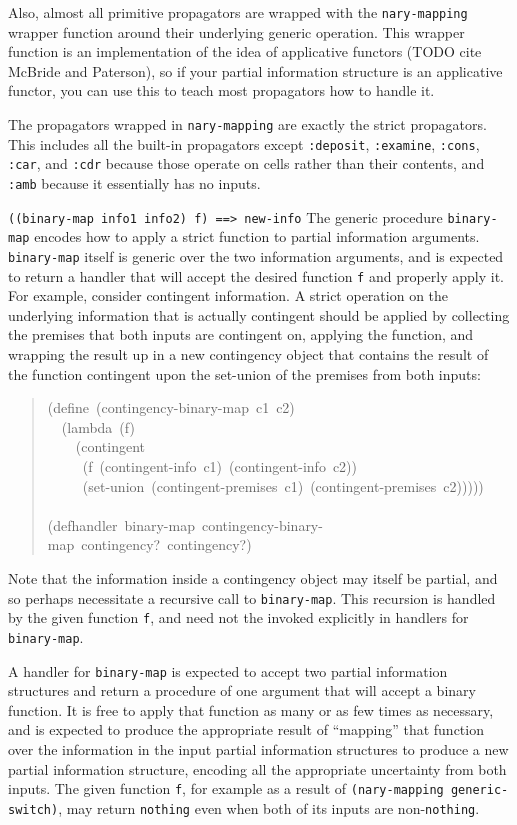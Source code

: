 \documentclass[12pt,letterpaper,english]{article}
\begin{document}
Also, almost all primitive propagators are wrapped
with the \texttt{nary-mapping} wrapper function around their underlying
generic operation.  This wrapper function is an implementation of the
idea of applicative functors (TODO cite McBride and Paterson), so if
your partial information structure is an applicative functor, you can
use this to teach most propagators how to handle it.

The propagators wrapped in \texttt{nary-mapping} are exactly the strict
propagators.  This includes all the built-in propagators except
\texttt{:deposit}, \texttt{:examine}, \texttt{:cons}, \texttt{:car}, and \texttt{:cdr} because
those operate on cells rather than their contents, and \texttt{:amb}
because it essentially has no inputs.

\texttt{((binary-map info1 info2) f)  ==>  new-info}
The generic procedure \texttt{binary-map} encodes how to apply a strict
function to partial information arguments.  \texttt{binary-map} itself is
generic over the two information arguments, and is expected to return
a handler that will accept the desired function \texttt{f} and properly
apply it.  For example, consider contingent information.  A strict
operation on the underlying information that is actually contingent
should be applied by collecting the premises that both inputs are
contingent on, applying the function, and wrapping the result up in a
new contingency object that contains the result of the function
contingent upon the set-union of the premises from both inputs:
\begin{quote}{\ttfamily \raggedright \noindent
(define~(contingency-binary-map~c1~c2)~\\
~~(lambda~(f)~\\
~~~~(contingent~\\
~~~~~(f~(contingent-info~c1)~(contingent-info~c2))~\\
~~~~~(set-union~(contingent-premises~c1)~(contingent-premises~c2)))))~\\
~\\
(defhandler~binary-map~contingency-binary-map~contingency?~contingency?)
}\end{quote}

Note that the information inside a contingency object may itself be
partial, and so perhaps necessitate a recursive call to
\texttt{binary-map}.  This recursion is handled by the given function
\texttt{f}, and need not the invoked explicitly in handlers for
\texttt{binary-map}.

A handler for \texttt{binary-map} is expected to accept two partial
information structures and return a procedure of one argument that
will accept a binary function.  It is free to apply that function as
many or as few times as necessary, and is expected to produce the
appropriate result of ``mapping'' that function over the information in
the input partial information structures to produce a new partial
information structure, encoding all the appropriate uncertainty from
both inputs.  The given function \texttt{f}, for example as a result of
\texttt{(nary-mapping generic-switch)}, may return \texttt{nothing} even when
both of its inputs are non-\texttt{nothing}.
\end{document}
